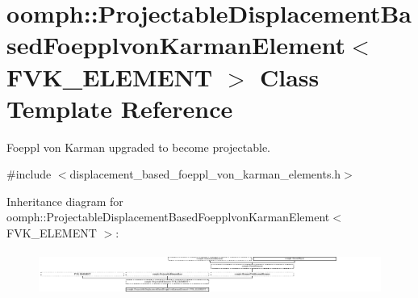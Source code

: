 \hypertarget{classoomph_1_1ProjectableDisplacementBasedFoepplvonKarmanElement}{}\section{oomph\+:\+:Projectable\+Displacement\+Based\+Foepplvon\+Karman\+Element$<$ F\+V\+K\+\_\+\+E\+L\+E\+M\+E\+NT $>$ Class Template Reference}
\label{classoomph_1_1ProjectableDisplacementBasedFoepplvonKarmanElement}


Foeppl von Karman upgraded to become projectable.  




{\ttfamily \#include $<$displacement\+\_\+based\+\_\+foeppl\+\_\+von\+\_\+karman\+\_\+elements.\+h$>$}

Inheritance diagram for oomph\+:\+:Projectable\+Displacement\+Based\+Foepplvon\+Karman\+Element$<$ F\+V\+K\+\_\+\+E\+L\+E\+M\+E\+NT $>$\+:\begin{figure}[H]
\begin{center}
\leavevmode
\includegraphics[height=1.405622cm]{classoomph_1_1ProjectableDisplacementBasedFoepplvonKarmanElement}
\end{center}
\end{figure}
